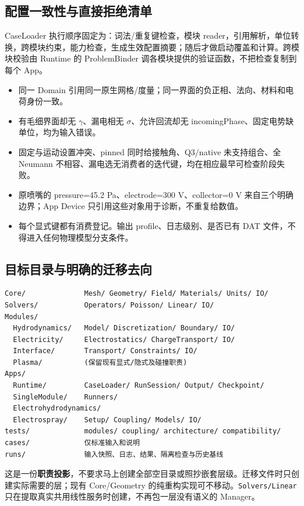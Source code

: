 \documentclass[UTF8,a4paper,11pt,fontset=fandol]{ctexart}
\numberwithin{equation}{section}
\newcommand{\code}[1]{\nolinkurl{#1}}
\begin{document}
\subsection{配置一致性与直接拒绝清单}
CaseLoader 执行顺序固定为：词法/重复键检查，模块 reader，引用解析，单位转换，跨模块约束，能力检查，生成生效配置摘要；随后才做启动覆盖和计算。跨模块校验由 Runtime 的 ProblemBinder 调各模块提供的验证函数，不把检查复制到每个 App。
\begin{itemize}
\item 同一 Domain 引用同一原生网格/度量；同一界面的负正相、法向、材料和电荷身份一致。
\item 有毛细界面却无 $\gamma$、漏电相无 $\sigma$、允许回流却无 incomingPhase、固定电势缺单位，均为输入错误。
\item 固定与运动设置冲突、pinned 同时给接触角、Q3/native 未支持组合、全 Neumann 不相容、漏电选无消费者的迭代键，均在相应最早可检查阶段失败。
\item 原喷嘴的 pressure=45.2 Pa、electrode=300 V、collector=0 V 来自三个明确边界；App Device 只引用这些对象用于诊断，不重复给数值。
\item 每个显式键都有消费登记。输出 profile、日志级别、是否已有 DAT 文件，不得进入任何物理模型分支条件。
\end{itemize}

\subsection{目标目录与明确的迁移去向}
\begin{verbatim}
Core/              Mesh/ Geometry/ Field/ Materials/ Units/ IO/
Solvers/           Operators/ Poisson/ Linear/ IO/
Modules/
  Hydrodynamics/   Model/ Discretization/ Boundary/ IO/
  Electricity/     Electrostatics/ ChargeTransport/ IO/
  Interface/       Transport/ Constraints/ IO/
  Plasma/          (保留现有显式/隐式及碰撞职责)
Apps/
  Runtime/         CaseLoader/ RunSession/ Output/ Checkpoint/
  SingleModule/    Runners/
  Electrohydrodynamics/
  Electrospray/    Setup/ Coupling/ Models/ IO/
tests/             modules/ coupling/ architecture/ compatibility/
cases/             仅标准输入和说明
runs/              输入快照、日志、结果、隔离检查与历史基线
\end{verbatim}
这是一份\textbf{职责投影}，不要求马上创建全部空目录或照抄嵌套层级。迁移文件时只创建实际需要的层；现有 Core/Geometry 的纯重构实现可不移动。\code{Solvers/Linear} 只在提取真实共用线性服务时创建，不再包一层没有语义的 Manager。
\end{document}
